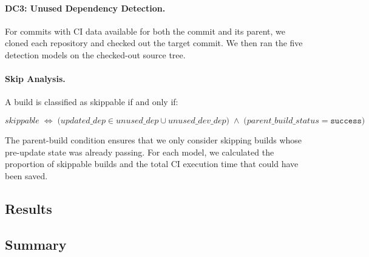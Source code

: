 \paragraph{DC3: Unused Dependency Detection.}
For commits with CI data available for both the commit and its parent,
we cloned each repository and checked out the target commit.
We then ran the five detection models on the checked-out source tree.

\paragraph{Skip Analysis.}
A build is classified as skippable if and only if:

\begin{equation}
  \textit{skippable} \;\Leftrightarrow\;
  \bigl(\textit{updated\_dep} \in \textit{unused\_dep}
        \cup \textit{unused\_dev\_dep}\bigr)
  \;\wedge\;
  \bigl(\textit{parent\_build\_status} = \texttt{success}\bigr)
\end{equation}

\noindent The parent-build condition ensures that we only consider
skipping builds whose pre-update state was already passing.
For each model, we calculated the proportion of skippable builds and
the total CI execution time that could have been saved.

\subsection{Results}

\subsection{Summary}
